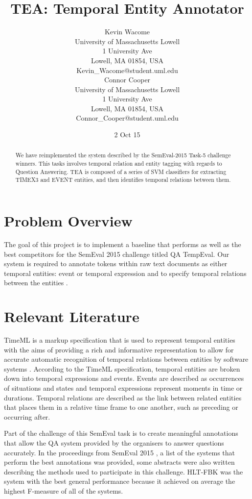 \documentclass[11pt,letterpaper]{article}
\title{TEA: Temporal Entity Annotator}
\author{Kevin Wacome\\
	    University of Massachusetts Lowell\\
	    1 University Ave\\
	    Lowell, MA 01854, USA\\
	    Kevin\_Wacome@student.uml.edu\\
	  \And
		Connor Cooper\\
	  	University of Massachusetts Lowell\\
	  	1 University Ave\\
	  	Lowell, MA 01854, USA\\
		Connor\_Cooper@student.uml.edu\\}
\date{2 Oct 15}
\begin{document}
\maketitle
\begin{abstract}
We have reimplemented the system described by the SemEval-2015 Task-5 challenge winners. This tasks involves temporal relation and entity tagging with regards to Question Answering. TEA is composed of a series of SVM classifiers for extracting TIMEX3 and EVENT entities, and then identifies temporal relations between them.
\end{abstract}

\section{Problem Overview}

The goal of this project is to implement a baseline that performs as well as the best competitors for the SemEval 2015 challenge titled QA TempEval. Our system is required to annotate tokens within raw text documents as either temporal entities: event or temporal expression and to specify temporal relations between the entities \cite{Llorens:15}.

\section{Relevant Literature}

TimeML is a markup specification that is used to represent temporal entities with the aims of providing a rich and informative representation to allow for accurate automatic recognition of temporal relations between entities by software systems \cite{Pustejovsky:03}. According to the TimeML specification, temporal entities are broken down into temporal expressions and events. Events are described as occurrences of situations and states and temporal expressions represent moments in time or durations. Temporal relations are described as the link between related entities that places them in a relative time frame to one another, such as preceding or occurring after.

Part of the challenge of this SemEval task is to create meaningful annotations that allow the QA system provided by the organisers to answer questions accurately. In the proceedings from SemEval 2015 \cite{Llorens:16}, a list of the systems that perform the best annotations was provided, some abstracts were also written describing the methods used to participate in this challenge. HLT-FBK was the system with the best general performance because it achieved on average the highest F-measure of all of the systems.
\end{document}

